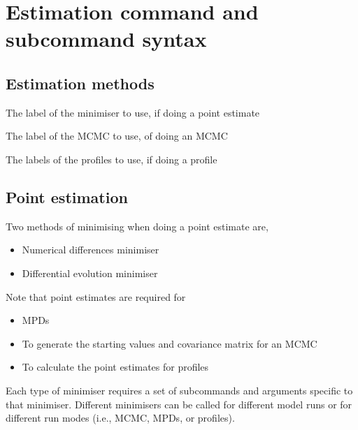 \section{Estimation command and subcommand syntax\label{sec:estimation-syntax}}

\subsection{Estimation methods}


 {The label of the minimiser to use, if doing a point estimate}

 {The label of the MCMC to use, of doing an MCMC}

 {The labels of the profiles to use, if doing a profile}


\subsection{Point estimation}

Two methods of minimising when doing a point estimate are, 
 
\begin{itemize}
	\item Numerical differences minimiser
  \item Differential evolution minimiser
\end{itemize}

Note that point estimates are required for

\begin{itemize}
  \item MPDs
  \item To generate the starting values and covariance matrix for an MCMC
  \item To calculate the point estimates for profiles
\end{itemize}
  
Each type of minimiser requires a set of subcommands and arguments specific to that minimiser. Different minimisers can be called for different model runs or for different run modes (i.e., MCMC, MPDs, or profiles).

